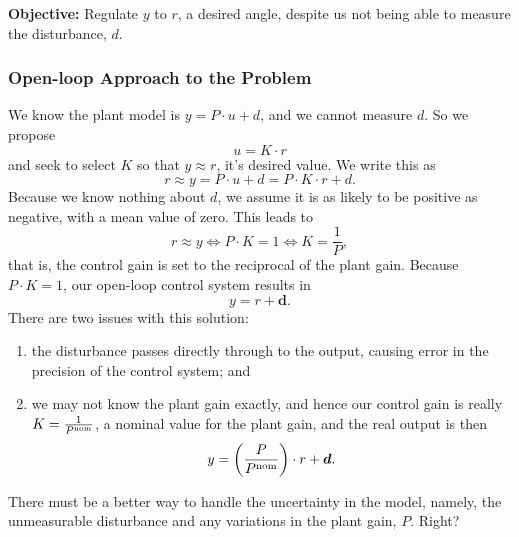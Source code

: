 \bigskip


\bigskip

\textbf{\Large Objective:} Regulate $y$ to $r$, a desired angle, despite us not being able to measure the disturbance, $d$. 

\bigskip

\subsubsection{Open-loop Approach to the Problem}
We know the plant model is $y = P \cdot u + d$, and we cannot measure $d$. So we propose 
\begin{equation}
u = K \cdot r
\end{equation}
and seek to select $K$ so that $y \approx r$, it's desired value. We write this as
\begin{equation}
r \approx y = P \cdot u + d = P \cdot K \cdot r + d.
\end{equation}
Because we know nothing about $d$, we assume it is as likely to be positive as negative, with a mean value of zero. This leads to 
\begin{equation}
r \approx y \iff P \cdot K = 1 \iff K = \frac{1}{P},
\end{equation}
that is, the control gain is set to the reciprocal of the plant gain. Because $P \cdot K =1$, our open-loop control system results in 
\begin{equation}
y =r + \bm{d}.
\end{equation}
There are two issues with this solution:
\begin{enumerate}
\renewcommand{\labelenumi}{(\alph{enumi})}
\setlength{\itemsep}{.2cm}
    \item the disturbance passes directly through to the output, causing error in the precision of the control system; and
    \item we may not know the plant gain exactly, and hence our control gain is really $K = \frac{1}{P^{\rm nom}}$, a nominal value for the plant gain, and the real output is then
    $$y = \left(\frac{P}{P^{\rm nom}} \right) \cdot r+ \bm{d}. $$
\end{enumerate}
There must be a better way to handle the uncertainty in the model, namely, the unmeasurable disturbance and any variations in the plant gain, $P$. Right?

